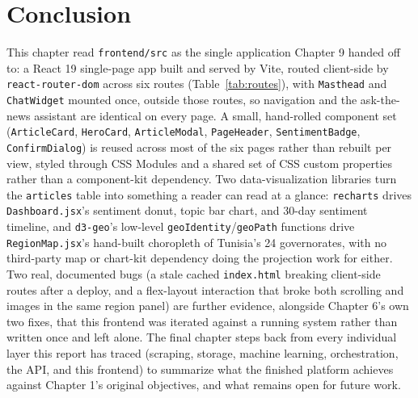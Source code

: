 \section{Conclusion}
\begin{sloppypar}
This chapter read \texttt{frontend/\allowbreak src} as the single application Chapter 9 handed off to: a React 19 single-page app built and served by Vite, routed client-side by \texttt{react-router-dom} across six routes (Table~\ref{tab:routes}), with \texttt{Masthead} and \texttt{ChatWidget} mounted once, outside those routes, so navigation and the ask-the-news assistant are identical on every page. A small, hand-rolled component set (\texttt{ArticleCard}, \texttt{HeroCard}, \texttt{ArticleModal}, \texttt{PageHeader}, \texttt{SentimentBadge}, \texttt{ConfirmDialog}) is reused across most of the six pages rather than rebuilt per view, styled through CSS Modules and a shared set of CSS custom properties rather than a component-kit dependency. Two data-visualization libraries turn the \texttt{articles} table into something a reader can read at a glance: \texttt{recharts} drives \texttt{Dashboard.jsx}'s sentiment donut, topic bar chart, and 30-day sentiment timeline, and \texttt{d3-geo}'s low-level \texttt{geoIdentity}/\texttt{geoPath} functions drive \texttt{RegionMap.jsx}'s hand-built choropleth of Tunisia's 24 governorates, with no third-party map or chart-kit dependency doing the projection work for either. Two real, documented bugs (a stale cached \texttt{index.html} breaking client-side routes after a deploy, and a flex-layout interaction that broke both scrolling and images in the same region panel) are further evidence, alongside Chapter 6's own two fixes, that this frontend was iterated against a running system rather than written once and left alone. The final chapter steps back from every individual layer this report has traced (scraping, storage, machine learning, orchestration, the API, and this frontend) to summarize what the finished platform achieves against Chapter 1's original objectives, and what remains open for future work.
\end{sloppypar}
